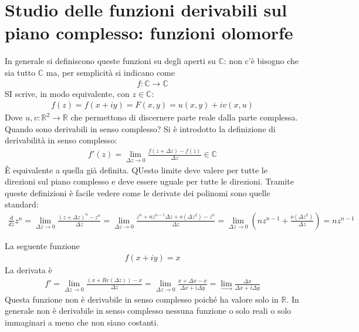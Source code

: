 \documentclass[a4paper, oneside]{article}
\begin{document}
\section{Studio delle funzioni derivabili sul piano complesso: funzioni olomorfe}
In generale si definiscono queste funzioni su degli aperti su $\mathbb{C}$: non c'è bisogno 
che sia tutto $\mathbb{C}$ ma, per semplicità si indicano come 
\begin{gather*}
    f: \mathbb{C} \to \mathbb{C} 
\end{gather*}
SI scrive, in modo equivalente, con $z \in \mathbb{C}$:
\begin{gather*}
    f(z) = f(x + iy) = F(x, y) = u(x, y) + iv(x, u)
\end{gather*}
Dove $u, v : \mathbb{R}^{2} \to \mathbb{R}$ che permettono di discernere parte 
reale dalla parte complessa. Quando sono derivabili in senso complesso? Si è introdotto la 
definizione di derivabilità in senso complesso:
\begin{align}
    f'(z) = \lim_{\Delta z \to 0} \frac{f(z + \Delta z) - f(z)}{\Delta z} \in \mathbb{C} 
\end{align}
È equivalente a quella già definita. QUesto limite deve valere per tutte le direzioni sul 
piano complesso e deve essere uguale per tutte le direzioni. Tramite queste definizioni è facile vedere come 
le derivate dei polinomi sono quelle standard:
\begin{gather*}
    \frac{d}{dz}z^{n} = \lim_{\Delta z \to 0} \frac{(z + \Delta z)^{n} - z^{n}}{\Delta z} = \lim_{\Delta z \to 0} \frac{z^{n} + nz^{n - 1} \Delta z + o(\Delta z^{2}) - z^{n}}{\Delta z} = \lim_{\Delta z \to 0} \left(n z^{n - 1} + \frac{o(\Delta z^{2})}{\Delta z}\right) = n z^{n - 1}   
\end{gather*}
\begin{example}
    La seguente funzione 
    \begin{gather*}
        f(x + iy) = x
    \end{gather*}
    La derivata è 
    \begin{gather*}
        f' = \lim_{\Delta z \to 0} \frac{(x + Re(\Delta z)) - x}{\Delta z} = \lim_{\Delta z \to 0} \frac{x + \Delta x  - x}{\Delta x + i\Delta y} = \lim_{ \to } \frac{\Delta x}{\Delta x + i\Delta y}  
    \end{gather*}
    Questa funzione non è derivabile in senso complesso poiché ha valore solo in $\mathbb{R}$. In generale 
    non è derivabile in senso complesso nessuna funzione o solo reali o solo immaginari a meno che 
    non siano costanti. 
\end{example}
\end{document}
